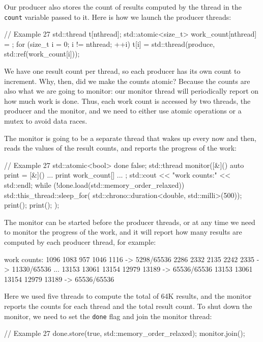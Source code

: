 Our producer also stores the count of results computed by the thread in the \texttt{count} variable passed to it. Here is how we launch the producer threads:

\begin{code}
// Example 27
std::thread t[nthread];
std::atomic<size_t> work_count[nthread] = {};
for (size_t i = 0; i != nthread; ++i) {
  t[i] = std::thread(produce, std::ref(work_count[i]));
}
\end{code}

We have one result count per thread, so each producer has its own count to increment. Why, then, did we make the counts atomic? Because the counts are also what we are going to monitor: our monitor thread will periodically report on how much work is done. Thus, each work count is accessed by two threads, the producer and the monitor, and we need to either use atomic operations or a mutex to avoid data races.

The monitor is going to be a separate thread that wakes up every now and then, reads the values of the result counts, and reports the progress of the work:

\begin{code}
// Example 27
std::atomic<bool> done {false};
std::thread monitor([&]() {
  auto print = [&]() { ... print work_count[] ... };
  std::cout << "work counts:" << std::endl;
  while (!done.load(std::memory_order_relaxed)) {
    std::this_thread::sleep_for(
      std::chrono::duration<double, std::milli>(500));
    print();
  }
  print();
});
\end{code}

The monitor can be started before the producer threads, or at any time we need to monitor the progress of the work, and it will report how many results are computed by each producer thread, for example:

\begin{code}
work counts:
1096 1083 957 1046 1116 -> 5298/65536
2286 2332 2135 2242 2335 -> 11330/65536
...
13153 13061 13154 12979 13189 -> 65536/65536
13153 13061 13154 12979 13189 -> 65536/65536
\end{code}

Here we used five threads to compute the total of 64K results, and the monitor reports the counts for each thread and the total result count. To shut down the monitor, we need to set the \texttt{done} flag and join the monitor thread:

\begin{code}
// Example 27
done.store(true, std::memory_order_relaxed);
monitor.join();
\end{code}

